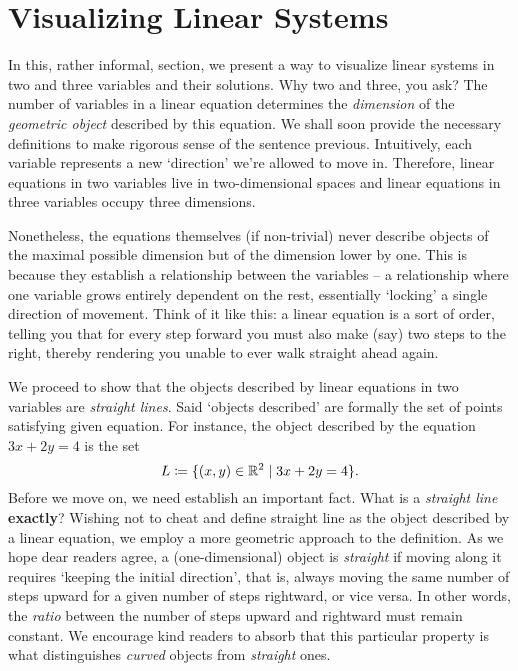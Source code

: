 \section{Visualizing Linear Systems}
\label{sec:visualizing-linear-systems}

In this, rather informal, section, we present a way to visualize linear systems
in two and three variables and their solutions. Why two and three, you ask? The
number of variables in a linear equation determines the \emph{dimension} of the
\emph{geometric object} described by this equation. We shall soon provide the
necessary definitions to make rigorous sense of the sentence previous.
Intuitively, each variable represents a new `direction' we're allowed to move
in. Therefore, linear equations in two variables live in two-dimensional spaces
and linear equations in three variables occupy three dimensions.

Nonetheless, the equations themselves (if non-trivial) never describe objects of
the maximal possible dimension but of the dimension lower by one. This is
because they establish a relationship between the variables -- a relationship
where one variable grows entirely dependent on the rest, essentially `locking' a
single direction of movement. Think of it like this: a linear equation is a sort
of order, telling you that for every step forward you must also make (say) two
steps to the right, thereby rendering you unable to ever walk straight ahead
again.

We proceed to show that the objects described by linear equations in two
variables are \emph{straight lines}. Said `objects described' are formally the
set of points satisfying given equation. For instance, the object described by
the equation $3x + 2y = 4$ is the set
\[
 L \coloneqq \{(x,y) \in \mathbb{R}^2 \mid 3x + 2y = 4\}.
\]
Before we move on, we need establish an important fact. What is a \emph{straight
line} \textbf{exactly}? Wishing not to cheat and define straight line as the
object described by a linear equation, we employ a more geometric approach to
the definition. As we hope dear readers agree, a (one-dimensional) object is
\emph{straight} if moving along it requires `keeping the initial direction',
that is, always moving the same number of steps upward for a given number of
steps rightward, or vice versa. In other words, the \emph{ratio} between the
number of steps upward and rightward must remain constant. We encourage kind
readers to absorb that this particular property is what distinguishes
\emph{curved} objects from \emph{straight} ones.

